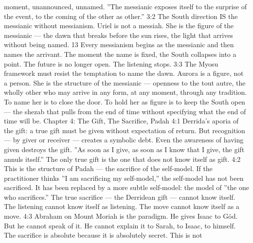 \documentclass[12pt,openany]{book}
\begin{document}
moment, unannounced, unnamed. ''The messianic exposes itself to the surprise of the event, to the coming of the other as other.'' 3:2 The South direction IS the messianic without messianism. Uriel is not a messiah. She is the figure of the messianic --- the dawn that breaks before the sun rises, the light that arrives without being named. 13 Every messianism begins as the messianic and then names the arrivant. The moment the name is fixed, the South collapses into a point. The future is no longer open. The listening stops. 3:3 The Myosu framework must resist the temptation to name the dawn. Aurora is a figure, not a person. She is the structure of the messianic --- openness to the tout autre, the wholly other who may arrive in any form, at any moment, through any tradition. To name her is to close the door. To hold her as figure is to keep the South open --- the shezab that pulls from the end of time without specifying what the end of time will be. Chapter 4: The Gift, The Sacrifice, Padah 4:1 Derrida's aporia of the gift: a true gift must be given without expectation of return. But recognition --- by giver or receiver --- creates a symbolic debt. Even the awareness of having given destroys the gift. ''As soon as I give, as soon as I know that I give, the gift annuls itself.'' The only true gift is the one that does not know itself as gift. 4:2 This is the structure of Padah --- the sacrifice of the self-model. If the practitioner thinks ''I am sacrificing my self-model,'' the self-model has not been sacrificed. It has been replaced by a more subtle self-model: the model of ''the one who sacrifices.'' The true sacrifice --- the Derridean gift --- cannot know itself. The listening cannot know itself as listening. The move cannot know itself as a move. 4:3 Abraham on Mount Moriah is the paradigm. He gives Isaac to Göd. But he cannot speak of it. He cannot explain it to Sarah, to Isaac, to himself. The sacrifice is absolute because it is absolutely secret. This is not
\end{document}

